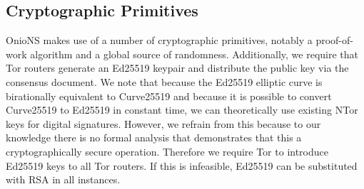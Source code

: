 \documentclass[conference]{IEEEtran}
\begin{document}
\subsection{Cryptographic Primitives}

OnioNS makes use of a number of cryptographic primitives, notably a proof-of-work algorithm and a global source of randomness. Additionally, we require that Tor routers generate an Ed25519 \cite{bernstein2011high} keypair and distribute the public key via the consensus document. We note that because the Ed25519 elliptic curve is birationally equivalent to Curve25519 \cite{bernstein2006curve25519} and because it is possible to convert Curve25519 to Ed25519 in constant time, we can theoretically use existing NTor \cite{goldberg2013anonymity} keys for digital signatures. However, we refrain from this because to our knowledge there is no formal analysis that demonstrates that this a cryptographically secure operation. Therefore we require Tor to introduce Ed25519 keys to all Tor routers. If this is infeasible, Ed25519 can be substituted with RSA in all instances.
\end{document}
